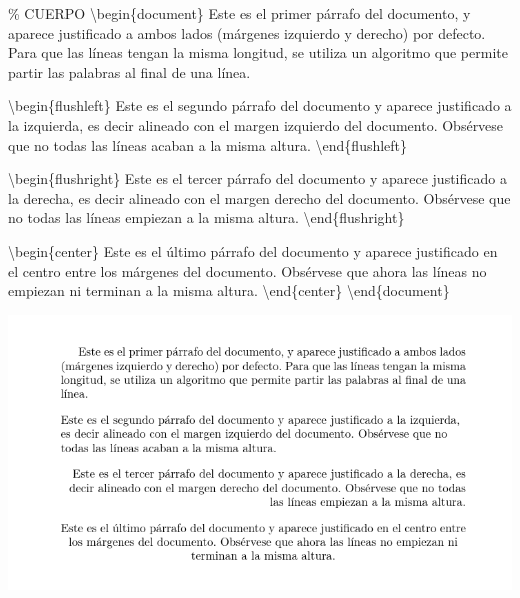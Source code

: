 \documentclass[
  letterpaper,
  DIV=11,
  numbers=noendperiod]{scrreport}
\newenvironment{Shaded}{\begin{snugshade}}{\end{snugshade}}
\newcommand{\CommentTok}[1]{\textcolor[rgb]{0.37,0.37,0.37}{#1}}
\newcommand{\ExtensionTok}[1]{\textcolor[rgb]{0.00,0.23,0.31}{#1}}
\newcommand{\KeywordTok}[1]{\textcolor[rgb]{0.00,0.23,0.31}{#1}}
\newcommand{\NormalTok}[1]{\textcolor[rgb]{0.00,0.23,0.31}{#1}}
\begin{document}
\begin{Shaded}
\begin{Highlighting}[]
\CommentTok{\% CUERPO}
\KeywordTok{\textbackslash{}begin}\NormalTok{\{}\ExtensionTok{document}\NormalTok{\}}
\NormalTok{Este es el primer párrafo del documento, y aparece justificado a ambos lados (márgenes izquierdo y derecho) por defecto. Para que las líneas tengan la misma longitud, se utiliza un algoritmo que permite partir las palabras al final de una línea.}

\KeywordTok{\textbackslash{}begin}\NormalTok{\{}\ExtensionTok{flushleft}\NormalTok{\}}
\NormalTok{Este es el segundo párrafo del documento y aparece justificado a la izquierda, es decir alineado con el margen izquierdo del documento. Obsérvese que no todas las líneas acaban a la misma altura.}
\KeywordTok{\textbackslash{}end}\NormalTok{\{}\ExtensionTok{flushleft}\NormalTok{\}}

\KeywordTok{\textbackslash{}begin}\NormalTok{\{}\ExtensionTok{flushright}\NormalTok{\}}
\NormalTok{Este es el tercer párrafo del documento y aparece justificado a la derecha, es decir alineado con el margen derecho del documento. Obsérvese que no todas las líneas empiezan a la misma altura.}
\KeywordTok{\textbackslash{}end}\NormalTok{\{}\ExtensionTok{flushright}\NormalTok{\}}

\KeywordTok{\textbackslash{}begin}\NormalTok{\{}\ExtensionTok{center}\NormalTok{\}}
\NormalTok{Este es el último párrafo del documento y aparece justificado en el centro entre los márgenes del documento. Obsérvese que ahora las líneas no empiezan ni terminan a la misma altura. }
\KeywordTok{\textbackslash{}end}\NormalTok{\{}\ExtensionTok{center}\NormalTok{\}}
\KeywordTok{\textbackslash{}end}\NormalTok{\{}\ExtensionTok{document}\NormalTok{\}}
\end{Highlighting}
\end{Shaded}

\begin{tcolorbox}[enhanced jigsaw, colback=white, colframe=quarto-callout-note-color-frame, title={Salida}, bottomtitle=1mm, colbacktitle=quarto-callout-note-color!10!white, bottomrule=.15mm, titlerule=0mm, opacityback=0, toptitle=1mm, arc=.35mm, left=2mm, rightrule=.15mm, toprule=.15mm, coltitle=black, leftrule=.75mm, opacitybacktitle=0.6, breakable]
\includegraphics{./img/secciones/justificacion.png}
\end{tcolorbox}
\end{document}
